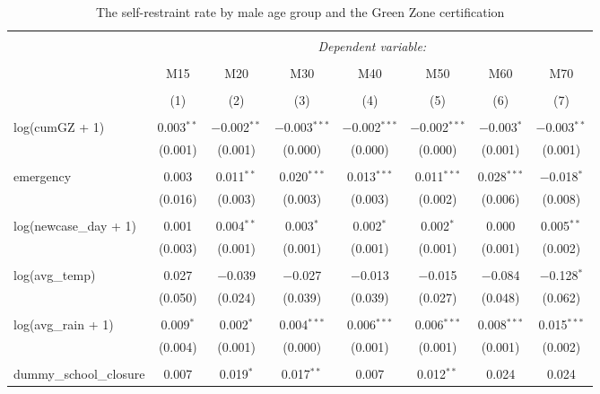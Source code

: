 
\begin{table}[!htbp] \centering 
  \caption{The self-restraint rate by male age group and the Green Zone certification} 
  \label{} 
\begin{tabular}{@{\extracolsep{-15pt}}lccccccc} 
\\[-1.8ex]\hline 
\hline \\[-1.8ex] 
 & \multicolumn{7}{c}{\textit{Dependent variable:}} \\ 
\cline{2-8} 
\\[-1.8ex] & M15 & M20 & M30 & M40 & M50 & M60 & M70 \\ 
\\[-1.8ex] & (1) & (2) & (3) & (4) & (5) & (6) & (7)\\ 
\hline \\[-1.8ex] 
 log(cumGZ + 1) & 0.003$^{**}$ & $-$0.002$^{**}$ & $-$0.003$^{***}$ & $-$0.002$^{***}$ & $-$0.002$^{***}$ & $-$0.003$^{*}$ & $-$0.003$^{**}$ \\ 
  & (0.001) & (0.001) & (0.000) & (0.000) & (0.000) & (0.001) & (0.001) \\ 
  & & & & & & & \\ 
 emergency & 0.003 & 0.011$^{**}$ & 0.020$^{***}$ & 0.013$^{***}$ & 0.011$^{***}$ & 0.028$^{***}$ & $-$0.018$^{*}$ \\ 
  & (0.016) & (0.003) & (0.003) & (0.003) & (0.002) & (0.006) & (0.008) \\ 
  & & & & & & & \\ 
 log(newcase\_day + 1) & 0.001 & 0.004$^{**}$ & 0.003$^{*}$ & 0.002$^{*}$ & 0.002$^{*}$ & 0.000 & 0.005$^{**}$ \\ 
  & (0.003) & (0.001) & (0.001) & (0.001) & (0.001) & (0.001) & (0.002) \\ 
  & & & & & & & \\ 
 log(avg\_temp) & 0.027 & $-$0.039 & $-$0.027 & $-$0.013 & $-$0.015 & $-$0.084 & $-$0.128$^{*}$ \\ 
  & (0.050) & (0.024) & (0.039) & (0.039) & (0.027) & (0.048) & (0.062) \\ 
  & & & & & & & \\ 
 log(avg\_rain + 1) & 0.009$^{*}$ & 0.002$^{*}$ & 0.004$^{***}$ & 0.006$^{***}$ & 0.006$^{***}$ & 0.008$^{***}$ & 0.015$^{***}$ \\ 
  & (0.004) & (0.001) & (0.000) & (0.001) & (0.001) & (0.001) & (0.002) \\ 
  & & & & & & & \\ 
 dummy\_school\_closure & 0.007 & 0.019$^{*}$ & 0.017$^{**}$ & 0.007 & 0.012$^{**}$ & 0.024 & 0.024 \\ 

\end{tabular}
\end{table}
